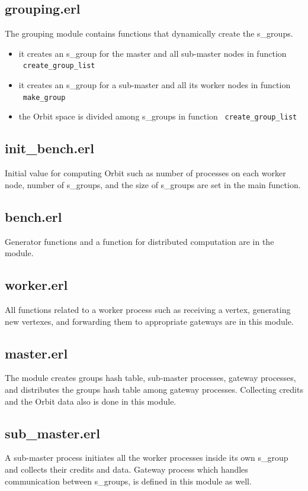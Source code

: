 \documentclass[11pt,a4paper]{article}
\begin{document}
\subsection*{grouping.erl}
The grouping module contains functions that dynamically create the s\_groups.
\begin{itemize}
\item it creates an s\_group for the master and all sub-master nodes in function ~\texttt{create\_group\_list}
\item it creates an s\_group for a sub-master and all its worker nodes in function ~\texttt{make\_group}
\item the Orbit space is divided among s\_groups in function ~\texttt{create\_group\_list}
\end{itemize}

\subsection*{init\_bench.erl}
Initial value for computing Orbit such as number of processes on each worker node, number of s\_groups, and the size of s\_groups are set in the main function.

\subsection*{bench.erl}
Generator functions and a function for distributed computation are in the module.

\subsection*{worker.erl}
All functions related to a worker process such as receiving a vertex, generating new vertexes, and forwarding them to appropriate gateways are in this module.

\subsection*{master.erl}
The module creates groups hash table, sub-master processes, gateway processes, and distributes the groups hash table among gateway processes. Collecting credits and the Orbit data also is done in this module.

\subsection*{sub\_master.erl}
A sub-master process initiates all the worker processes inside its own s\_group and collects their credits and data. Gateway process which handles communication between s\_groups, is defined in this module as well.
\end{document}

